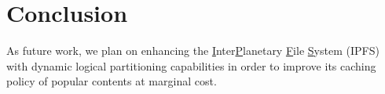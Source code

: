 
\section{Conclusion}
\label{sec:conclusion}

As future work, we plan on enhancing the
\underline{I}nter\underline{P}lanetary \underline{F}ile
\underline{S}ystem (IPFS)~\cite{henningsen2020mapping} with dynamic
logical partitioning capabilities in order to improve its caching
policy of popular contents at marginal cost.

